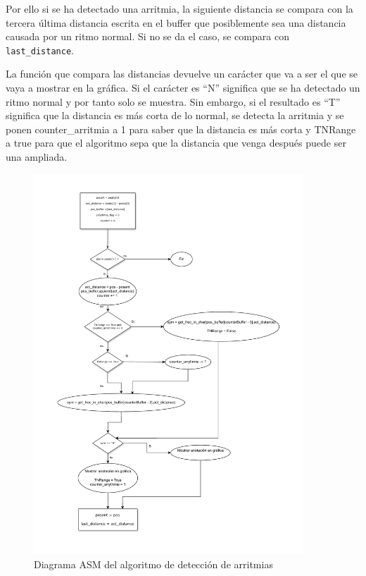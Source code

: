 Por ello si se ha detectado una arritmia, la siguiente distancia se compara con
la tercera última distancia escrita en el buffer que posiblemente sea una distancia causada por un ritmo normal. 
Si no se da el caso, se compara con \texttt{last\_distance}.

La función que compara las distancias devuelve un carácter que va a ser el que se vaya a mostrar en la gráfica. 
Si el carácter es ``N'' significa que se ha detectado un ritmo normal y por tanto solo se muestra. Sin embargo, si el 
resultado es ``T'' significa que la distancia es más corta de lo normal, se detecta la arritmia y se ponen
counter\_arritmia a 1 para saber que la distancia es más corta y TNRange a true para que el algoritmo sepa 
que la distancia que venga después puede ser una ampliada. 

\begin{figure}[h!]
	\centering
    \includegraphics[width=0.9\textwidth]{./Images/img_algoritmo/Diagramaarritmias.pdf}
    \caption{Diagrama ASM del algoritmo de detección de arritmias}
    \label{fig:diagramaarritmias}
\end{figure} 

